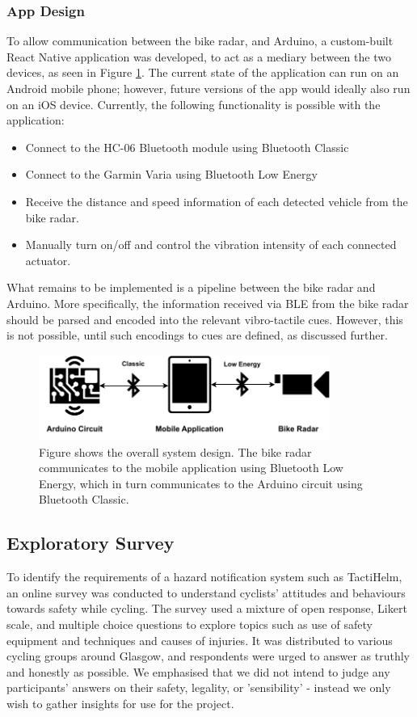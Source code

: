 \documentclass{interim}
\begin{document}
\subsubsection{App Design}
To allow communication between the bike radar, and Arduino, a custom-built React Native application was developed, to act as a mediary between the two devices, as seen in Figure \ref{fig:overall-system}. The current state of the application can run on an Android mobile phone; however, future versions of the app would ideally also run on an iOS device. Currently, the following functionality is possible with the application:
\begin{itemize}
    \item Connect to the HC-06 Bluetooth module using Bluetooth Classic
    \item Connect to the Garmin Varia using Bluetooth Low Energy
    \item Receive the distance and speed information of each detected vehicle from the bike radar.
    \item Manually turn on/off and control the vibration intensity of each connected actuator.
\end{itemize}

What remains to be implemented is a pipeline between the bike radar and Arduino. More specifically, the information received via BLE from the bike radar should be parsed and encoded into the relevant vibro-tactile cues. However, this is not possible, until such encodings to cues are defined, as discussed further.

\begin{figure}[!ht]
    \centering
    \includegraphics[width=0.85\textwidth]{images/overall-system.pdf}
    \caption{Figure shows the overall system design. The bike radar communicates to the mobile application using Bluetooth Low Energy, which in turn communicates to the Arduino circuit using Bluetooth Classic.}
    \label{fig:overall-system}
\end{figure}


\subsection{Exploratory Survey}\label{sec:survey}
To identify the requirements of a hazard notification system such as TactiHelm, an online survey was conducted to understand cyclists' attitudes and behaviours towards safety while cycling. The survey used a mixture of open response, Likert scale, and multiple choice questions to explore topics such as use of safety equipment and techniques and causes of injuries. It was distributed to various cycling groups around Glasgow, and respondents were urged to answer as truthly and honestly as possible. We emphasised that we did not intend to judge any participants' answers on their safety, legality, or 'sensibility' - instead we only wish to gather insights for use for the project.
\end{document}
